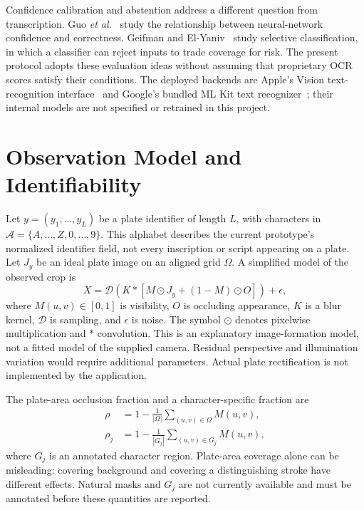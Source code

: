 \documentclass[journal]{IEEEtran}
\newcommand{\calA}{\mathcal{A}}
\newcommand{\calD}{\mathcal{D}}
\begin{document}
Confidence calibration and abstention address a different question from transcription. Guo \emph{et al.}~\cite{guo2017} study the relationship between neural-network confidence and correctness. Geifman and El-Yaniv~\cite{geifman2017} study selective classification, in which a classifier can reject inputs to trade coverage for risk. The present protocol adopts these evaluation ideas without assuming that proprietary OCR scores satisfy their conditions. The deployed backends are Apple's Vision text-recognition interface~\cite{applevision} and Google's bundled ML Kit text recognizer~\cite{mlkit}; their internal models are not specified or retrained in this project.

\section{Observation Model and Identifiability}\label{sec:observation}
Let $y=(y_1,\ldots,y_L)$ be a plate identifier of length $L$, with characters in $\calA=\{A,\ldots,Z,0,\ldots,9\}$. This alphabet describes the current prototype's normalized identifier field, not every inscription or script appearing on a plate. Let $J_y$ be an ideal plate image on an aligned grid $\Omega$. A simplified model of the observed crop is
\begin{equation}\label{eq:formation}
 X=\calD\!\left(K*\left[M\odot J_y+(1-M)\odot O\right]\right)+\epsilon,
\end{equation}
where $M(u,v)\in[0,1]$ is visibility, $O$ is occluding appearance, $K$ is a blur kernel, $\calD$ is sampling, and $\epsilon$ is noise. The symbol $\odot$ denotes pixelwise multiplication and $*$ convolution. This is an explanatory image-formation model, not a fitted model of the supplied camera. Residual perspective and illumination variation would require additional parameters. Actual plate rectification is not implemented by the application.

The plate-area occlusion fraction and a character-specific fraction are
\begin{align}
 \rho &= 1-\frac{1}{|\Omega|}\sum_{(u,v)\in\Omega}M(u,v),\label{eq:rho}\\
 \rho_j &= 1-\frac{1}{|G_j|}\sum_{(u,v)\in G_j}M(u,v),\label{eq:rhochar}
\end{align}
where $G_j$ is an annotated character region. Plate-area coverage alone can be misleading: covering background and covering a distinguishing stroke have different effects. Natural masks and $G_j$ are not currently available and must be annotated before these quantities are reported.
\end{document}
